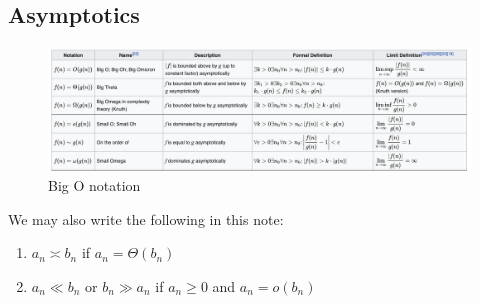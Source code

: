 \documentclass{article}
\begin{document}
\subsection{Asymptotics}
\begin{figure}[ht]
 \centering
 \includegraphics[width=1\linewidth]{Figs/big_o.png}
\centering
\caption{Big O notation}
		\label{un:figbigo}
\end{figure}
We may also write the following in this note:
\begin{enumerate}
    \item $a_{n} \asymp b_{n}$ if $a_{n}=\Theta\left(b_{n}\right)$
    \item $a_{n} \ll b_{n}$ or $b_{n} \gg a_{n}$ if $a_{n} \geq 0$ and $a_{n}=o\left(b_{n}\right)$
\end{enumerate}
\end{document}
